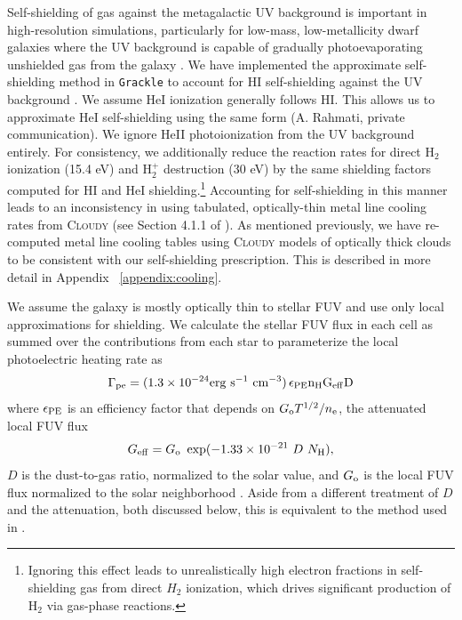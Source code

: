 Self-shielding of gas against the metagalactic UV background is important in high-resolution simulations, particularly for low-mass, low-metallicity dwarf galaxies where the UV background is capable of gradually photoevaporating unshielded gas from the galaxy \citep{Simpson2013}. We have implemented the \citet{Rahmati2013} approximate self-shielding method in \texttt{Grackle} to account for HI self-shielding against the UV background \citep[see][ for more details of this implementation]{GrackleMethod}. We assume HeI ionization generally follows HI. This allows us to approximate HeI self-shielding using the same form (A. Rahmati, private communication). We ignore HeII photoionization from the UV background entirely. For consistency, we additionally reduce the reaction rates for direct H$_2$ ionization (15.4 eV) and H$_2^+$ destruction (30 eV) by the same shielding factors computed for HI and HeI shielding.\footnote{Ignoring this effect leads to unrealistically high electron fractions in self-shielding gas from direct $H_2$ ionization, which drives significant production of H$_2$ via gas-phase reactions.} Accounting for self-shielding in this manner leads to an inconsistency in using tabulated, optically-thin metal line cooling rates from \textsc{Cloudy} (see Section 4.1.1 of \citet{Hu2017}). As mentioned previously, we have re-computed metal line cooling tables using \textsc{Cloudy} models of optically thick clouds to be consistent with our self-shielding prescription. This is described in more detail in Appendix ~\ref{appendix:cooling}.


We assume the galaxy is mostly optically thin to stellar FUV and use only local approximations for shielding.  We calculate the stellar FUV flux in each cell as summed over the contributions from each star to parameterize the local photoelectric heating rate as \citep{BakesTielens1994,Wolfire2003,Bergin2004}
\begin{equation}
\label{eq:PE}
\Gamma_{\rm pe} = (1.3 \times 10^{-24} \rm{erg~s^{-1}~cm^{-3}})\, \epsilon_{\rm PE} n_{\rm H} G_{\rm eff} D
\end{equation}
where $\epsilon_{\rm PE}$ is an efficiency factor that depends on $G_{\rm{o}} T^{1/2} /n_{\rm{e}}$, the attenuated local FUV flux \begin{equation} G_{\rm eff} = G_{\rm o}~\exp(-1.33\times10^{-21}~D~N_{\rm H}), \end{equation} $D$ is the dust-to-gas ratio, normalized to the solar value, and $G_{\rm o}$ is the local FUV flux normalized to the solar neighborhood \citep{Habing1968}. Aside from a different treatment of $D$ and the attenuation, both discussed below, this is equivalent to the method used in \citet{Hu2016,Hu2017}.

